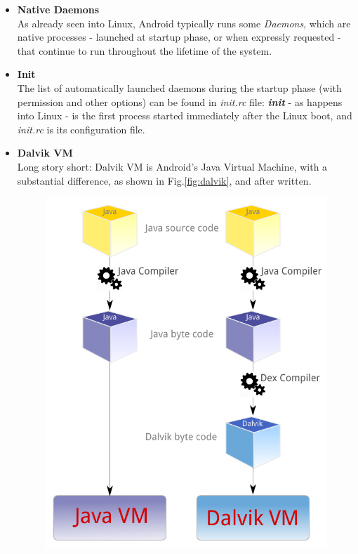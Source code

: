 \begin{itemize}
\item \textbf{Native Daemons}\\
As already seen into Linux, Android typically runs some \textit{Daemons}, which are native processes - launched at startup phase, or when expressly requested - that continue to run throughout the lifetime of the system.
\item \textbf{Init}\\
The list of automatically launched daemons during the startup phase (with permission and other options) can be found in \textit{init.rc} file: \textit{\textbf{init}} - as happens into Linux - is the first process started immediately after the Linux boot, and \textit{init.rc} is its configuration file.
\item \textbf{Dalvik VM}\\
Long story short: Dalvik VM is Android's Java Virtual Machine, with a substantial difference, as shown in Fig.\ref{fig:dalvik}, and after written.\\
\begin{figure}[!htb]
	\centering
	\includegraphics[scale=.7]{images/dalvik.pdf}

\end{figure}
\end{itemize}
